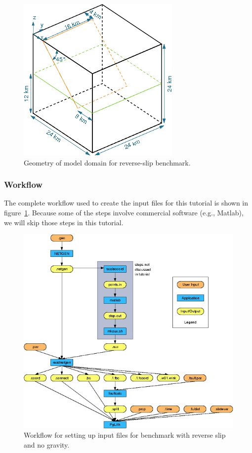 \begin{figure}
  \begin{center}
    \includegraphics{figs/geometry}
    \caption{Geometry of model domain for reverse-slip benchmark.}
  \end{center}
\end{figure}  

\subsubsection{Workflow}

The complete workflow used to create the input files for this tutorial
is shown in figure~\ref{fig:bmrsnog:workflow}. Because some of the
steps involve commercial software (e.g., Matlab), we will skip those
steps in this tutorial.

\begin{figure}[htbp]
  \begin{center}
    \includegraphics{figs/workflow}
    \caption{Workflow for setting up input files for benchmark with reverse
      slip and no gravity.}
    \label{fig:bmrsnog:workflow}
  \end{center}
\end{figure}

